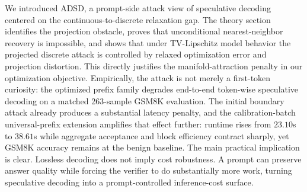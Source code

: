 \documentclass{article}
\begin{document}
We introduced ADSD, a prompt-side attack view of speculative decoding centered
on the continuous-to-discrete relaxation gap. The theory section identifies the
projection obstacle, proves that unconditional nearest-neighbor recovery is
impossible, and shows that under TV-Lipschitz model behavior the projected
discrete attack is controlled by relaxed optimization error and projection
distortion. This directly justifies the manifold-attraction penalty in our
optimization objective. Empirically, the attack is not merely a first-token
curiosity: the optimized prefix family degrades end-to-end token-wise
speculative decoding on a matched 263-sample GSM8K evaluation. The initial
boundary attack already produces a substantial latency penalty, and the
calibration-batch universal-prefix extension amplifies that effect further:
runtime rises from $23.10$s to $38.61$s while aggregate acceptance and block
efficiency contract sharply, yet GSM8K accuracy remains at the benign baseline.
The main practical implication is clear. Lossless decoding does not imply cost
robustness. A prompt can preserve answer quality while forcing the verifier to
do substantially more work, turning speculative decoding into a
prompt-controlled inference-cost surface.







\end{document}
